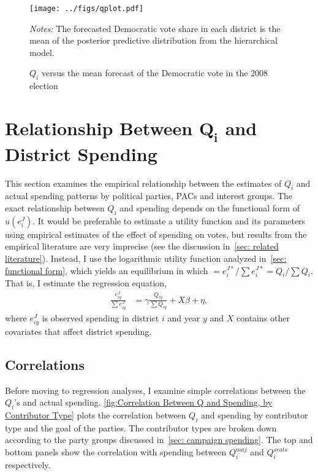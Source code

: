 \documentclass[12pt,final,fleqn]{article}
\theoremstyle{plain}
\begin{document}
\begin{figure}[!htb]
\texttt{[image: ../figs/qplot.pdf]}
\vspace{.5cm}
\caption{$Q_i$ versus the mean forecast of the Democratic vote in the 2008 election}
\label{fig: $Q_i$ versus the mean forecast of the Democratic vote in the 2008 election}
\begin{minipage}{\linewidth}
\footnotesize
\emph{Notes:} The forecasted Democratic vote share in each district is the mean of the posterior predictive distribution from the hierarchical model.
\end{minipage}
\end{figure}

\section{Relationship Between $\mathbf{Q_i}$ and District Spending}
This section examines the empirical relationship between the estimates of $Q_i$ and actual spending patterns by political parties, PACs and interest groups. The exact relationship between $Q_i$ and spending depends on the functional form of $u(e^J_i)$. It would be preferable to estimate a utility function and its parameters using empirical estimates of the effect of spending on votes, but results from the empirical literature are very imprecise (see the discussion in~\autoref{sec: related literature}). Instead, I use the logarithmic utility function analyzed in~\autoref{sec: functional form}, which yields an equilibrium in which $=e_i^{J*}/\sum e_i^{J*} =Q_i/\sum Q_i$. That is, I estimate the regression equation,
\begin{align} \label{eqn: regression eqn}
\frac{e_{iy}^{J}}{\sum e_{iy}^{J}} &= \gamma \frac{Q_{iy}}{\sum Q_{iy}} + X\beta + \eta,
\end{align} 
where $e_{iy}^{J}$ is observed spending in district $i$ and year $y$ and $X$ contains other covariates that affect district spending.
 
\subsection{Correlations}
Before moving to regression analyses, I examine simple correlations between the $Q_i$'s and actual spending. \autoref{fig:Correlation Between Q and Spending, by Contributor Type} plots the correlation between $Q_i$ and spending by contributor type and the goal of the parties. The contributor types are broken down according to the party groups discussed in~\autoref{sec: campaign spending}. The top and bottom panels show the correlation with spending between $Q_i^{maj}$ and $Q_i^{seats}$ respectively.
\end{document}

